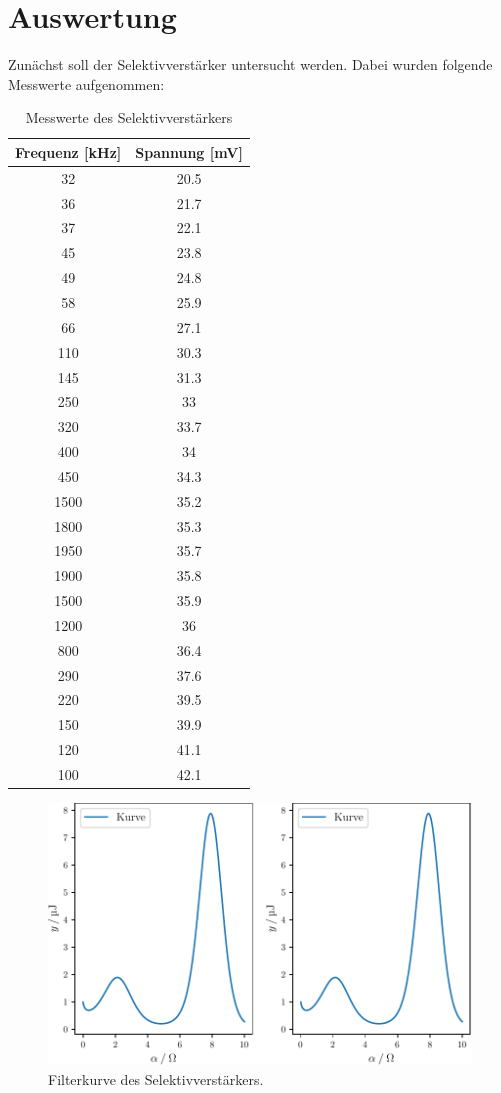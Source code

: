 \section{Auswertung}
\label{sec:Auswertung}

Zunächst soll der Selektivverstärker untersucht werden. Dabei wurden folgende Messwerte aufgenommen:

\begin{table}[H]
  \centering
  \caption{Messwerte des Selektivverstärkers}
  \label{tab:mag}
  \begin{tabular}{c c}
   \toprule
    Frequenz [kHz] & Spannung [mV]\\
   \midrule
   32 & 20.5 \\
   36 & 21.7 \\
   37 & 22.1 \\
   45 & 23.8 \\
   49 & 24.8 \\
   58 & 25.9 \\
   66 & 27.1 \\
  110 & 30.3 \\
  145 & 31.3 \\
  250 & 33   \\
  320 & 33.7 \\
  400 & 34   \\
  450 & 34.3 \\
  1500 & 35.2 \\
  1800 & 35.3 \\
  1950 & 35.7 \\
  1900 & 35.8 \\
  1500 & 35.9 \\
  1200 & 36   \\
  800 & 36.4 \\
  290 & 37.6 \\
  220 & 39.5 \\
  150 & 39.9 \\
  120 & 41.1 \\
  100 & 42.1 \\
   \bottomrule
  \end{tabular}
 \end{table} 

\begin{figure}[H]
  \centering
  \includegraphics{build/plot.pdf}
  \caption{Filterkurve des Selektivverstärkers.}
  \label{fig:plot}
\end{figure}

